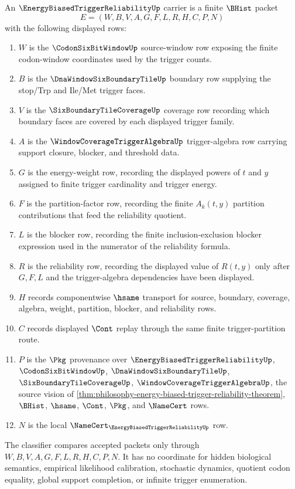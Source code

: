 \begin{definition}
\label{def:energy-biased-trigger-reliability-carrier}
An $\EnergyBiasedTriggerReliabilityUp$ carrier is a finite $\BHist$ packet
$$
E=(W,B,V,A,G,F,L,R,H,C,P,N)
$$
with the following displayed rows:
\begin{enumerate}
\item $W$ is the $\CodonSixBitWindowUp$ source-window row exposing the finite codon-window coordinates used by the trigger counts.
\item $B$ is the $\DnaWindowSixBoundaryTileUp$ boundary row supplying the stop/Trp and Ile/Met trigger faces.
\item $V$ is the $\SixBoundaryTileCoverageUp$ coverage row recording which boundary faces are covered by each displayed trigger family.
\item $A$ is the $\WindowCoverageTriggerAlgebraUp$ trigger-algebra row carrying support closure, blocker, and threshold data.
\item $G$ is the energy-weight row, recording the displayed powers of $t$ and $y$ assigned to finite trigger cardinality and trigger energy.
\item $F$ is the partition-factor row, recording the finite $A_k(t,y)$ partition contributions that feed the reliability quotient.
\item $L$ is the blocker row, recording the finite inclusion-exclusion blocker expression used in the numerator of the reliability formula.
\item $R$ is the reliability row, recording the displayed value of $R(t,y)$ only after $G,F,L$ and the trigger-algebra dependencies have been displayed.
\item $H$ records componentwise $\hsame$ transport for source, boundary, coverage, algebra, weight, partition, blocker, and reliability rows.
\item $C$ records displayed $\Cont$ replay through the same finite trigger-partition route.
\item $P$ is the $\Pkg$ provenance over $\EnergyBiasedTriggerReliabilityUp$, $\CodonSixBitWindowUp$, $\DnaWindowSixBoundaryTileUp$, $\SixBoundaryTileCoverageUp$, $\WindowCoverageTriggerAlgebraUp$, the source vision of \autoref{thm:philosophy-energy-biased-trigger-reliability-theorem}, $\BHist$, $\hsame$, $\Cont$, $\Pkg$, and $\NameCert$ rows.
\item $N$ is the local $\NameCert_{\EnergyBiasedTriggerReliabilityUp}$ row.
\end{enumerate}
The classifier compares accepted packets only through $W,B,V,A,G,F,L,R,H,C,P,N$. It has no coordinate for hidden biological semantics, empirical likelihood calibration, stochastic dynamics, quotient codon equality, global support completion, or infinite trigger enumeration.
\end{definition}

